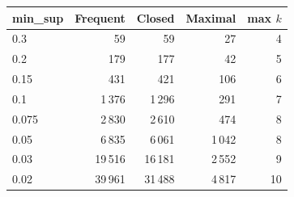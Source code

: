 \begin{tabular}{@{}lrrrr@{}}
\toprule
min\_sup & Frequent & Closed & Maximal & max $k$ \\
\midrule
0.3 & 59 & 59 & 27 & 4 \\
0.2 & 179 & 177 & 42 & 5 \\
0.15 & 431 & 421 & 106 & 6 \\
0.1 & 1\,376 & 1\,296 & 291 & 7 \\
0.075 & 2\,830 & 2\,610 & 474 & 8 \\
0.05 & 6\,835 & 6\,061 & 1\,042 & 8 \\
0.03 & 19\,516 & 16\,181 & 2\,552 & 9 \\
0.02 & 39\,961 & 31\,488 & 4\,817 & 10 \\
\bottomrule
\end{tabular}
